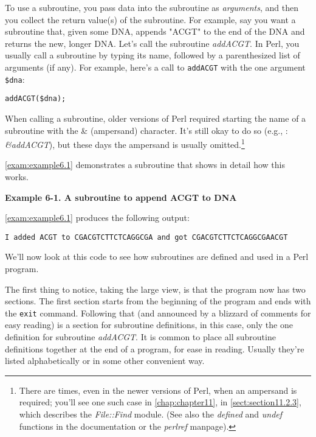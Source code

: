 To use a subroutine, you pass data into the subroutine as \textit{arguments}, and then you collect the return value(s) of the subroutine. For example, say you want a subroutine that, given some DNA, appends "ACGT" to the end of the DNA and returns the new, longer DNA. Let's call the subroutine \textit{addACGT}. In Perl, you usually call a subroutine by typing its name, followed by a parenthesized list of arguments (if any). For example, here's a call to \verb|addACGT| with the one argument \verb|$dna|: 

\begin{lstlisting}
addACGT($dna);
\end{lstlisting}

When calling a subroutine, older versions of Perl required starting the name of a subroutine with the \& (ampersand) character. It's still okay to do so (e.g., : \textit{\&addACGT}), but these days the ampersand is usually omitted.\footnote{There are times, even in the newer versions of Perl, when an ampersand is required; you'll see one such case in \autoref{chap:chapter11}, in \autoref{sect:section11.2.3}, which describes the \textit{File::Find} module. (See also the \textit{defined} and \textit{undef} functions in the documentation or the \textit{perlref} manpage).}

\autoref{exam:example6.1} demonstrates a subroutine that shows in detail how this works. 

\textbf{Example 6-1. A subroutine to append ACGT to DNA}


\autoref{exam:example6.1} produces the following output:

\begin{lstlisting}
I added ACGT to CGACGTCTTCTCAGGCGA and got CGACGTCTTCTCAGGCGAACGT
\end{lstlisting}

We'll now look at this code to see how subroutines are defined and used in a Perl program. 

The first thing to notice, taking the large view, is that the program now has two sections. The first section starts from the beginning of the program and ends with the \verb|exit| command. Following that (and announced by a blizzard of comments for easy reading) is a section for subroutine definitions, in this case, only the one definition for subroutine \textit{addACGT}. It is common to place all subroutine definitions together at the end of a program, for ease in reading. Usually they're listed alphabetically or in some other convenient way.

